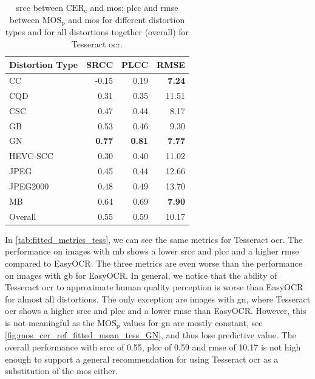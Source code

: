 \begin{table}[h!]
    \centering
    \begin{tabular}{|l|rrr|}
        \hline
        Distortion Type & SRCC & PLCC & RMSE \\
        \hline
        \hline
        CC & -0.15 & 0.19 & \textbf{7.24} \\
        CQD & 0.31 & 0.35 & 11.51 \\
        CSC & 0.47 & 0.44 & 8.17 \\
        GB & 0.53 & 0.46 & 9.30 \\
        GN & \textbf{0.77} & \textbf{0.81} & \textbf{7.77} \\
        HEVC-SCC & 0.30 & 0.40 & 11.02 \\
        JPEG & 0.45 & 0.44 & 12.66 \\
        JPEG2000 & 0.48 & 0.49 & 13.70 \\
        MB & 0.64 & 0.69 & \textbf{7.90} \\
        \hline
        Overall & 0.55 & 0.59 & 10.17 \\
        \hline
    \end{tabular}
    \caption{\gls{srcc} between $\text{CER}_{\text{c}}$ and \gls{mos}; \gls{plcc} and \gls{rmse} between $\text{MOS}_{\text{p}}$ and \gls{mos} for different distortion types and for all distortions together (overall) for Tesseract \gls{ocr}.}
    \label{tab:fitted_metrics_tess}
\end{table}

In \autoref{tab:fitted_metrics_tess}, we can see the same metrics for Tesseract \gls{ocr}.
The performance on images with \gls{mb} shows a lower \gls{srcc} and \gls{plcc} and a higher \gls{rmse} compared to EasyOCR.
The three metrics are even worse than the performance on images with \gls{gb} for EasyOCR.
In general, we notice that the ability of Tesseract \gls{ocr} to approximate human quality perception is worse than EasyOCR for almost all distortions.
The only exception are images with \gls{gn}, where Tesseract \gls{ocr} shows a higher \gls{srcc} and \gls{plcc} and a lower \gls{rmse} than EasyOCR.
However, this is not meaningful as the $\text{MOS}_{\text{p}}$ values for \gls{gn} are mostly constant, see \autoref{fig:mos_cer_ref_fitted_mean_tess_GN}, and thus lose predictive value.
The overall performance with \gls{srcc} of 0.55, \gls{plcc} of 0.59 and \gls{rmse} of 10.17 is not high enough to support a general recommendation for using Tesseract \gls{ocr} as a substitution of the \gls{mos} either.

